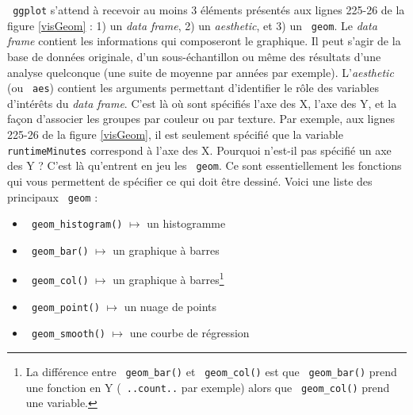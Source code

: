 \documentclass[10.5pt,a4paper]{article}
\newcommand{\rcode}[1]{\texttt{\color{rstudio} #1}}
\begin{document}
  \rcode{ggplot} s'attend à recevoir au moins 3 éléments présentés aux lignes 225-26 de la figure \ref{visGeom} : 1) un \emph{data frame}, 2) un \textit{aesthetic}, et 3) un \rcode{geom}. Le \emph{data frame} contient les informations qui composeront le graphique. Il peut s'agir de la base de données originale, d'un sous-échantillon ou même des résultats d'une analyse quelconque (une suite de moyenne par années par exemple). L'\textit{aesthetic} (ou \rcode{aes}) contient les arguments permettant d'identifier le rôle des variables d'intérêts du \emph{data frame}. C'est là où sont spécifiés l'axe des X, l'axe des Y, et la façon d'associer les groupes par couleur ou par texture. Par exemple, aux lignes 225-26 de la figure \ref{visGeom}, il est seulement spécifié que la variable \rcode{runtimeMinutes} correspond à l'axe des X. Pourquoi n'est-il pas spécifié un axe des Y ? C'est là qu'entrent en jeu les \rcode{geom}. Ce sont essentiellement les fonctions qui vous permettent de spécifier ce qui doit être dessiné. Voici une liste des principaux \rcode{geom} :
  
  \begin{itemize}
    \item \rcode{geom\_histogram()} $\mapsto$ un histogramme
    \item \rcode{geom\_bar()} $\mapsto$ un graphique à barres
    \item \rcode{geom\_col()} $\mapsto$ un graphique à barres\footnote{La différence entre \rcode{geom\_bar()} et \rcode{geom\_col()} est que \rcode{geom\_bar()} prend une fonction en Y (\rcode{..count..} par exemple) alors que \rcode{geom\_col()} prend une variable.}
    \item \rcode{geom\_point()} $\mapsto$ un nuage de points
    \item \rcode{geom\_smooth()} $\mapsto$ une courbe de régression
  \end{itemize}
  
\end{document}

